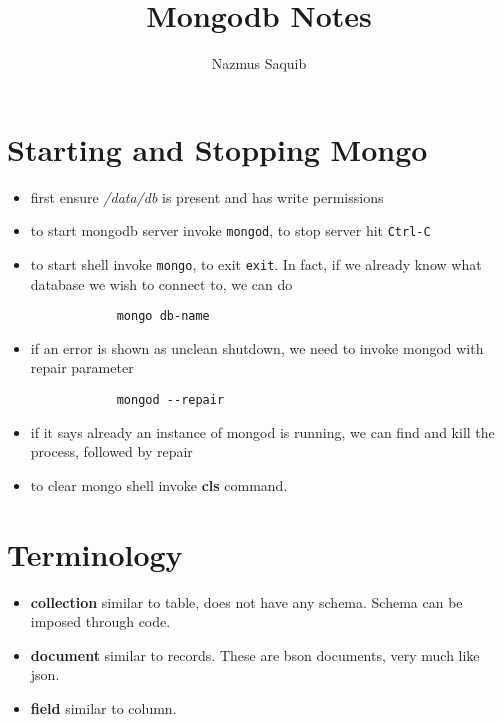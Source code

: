 \documentclass[a4paper, 12pt]{article}
\begin{document}
\title{Mongodb Notes}
\author{Nazmus Saquib}

\maketitle
\tableofcontents

\section{Starting and Stopping Mongo}
\begin{itemize}
    \item first ensure \emph{/data/db} is present and has write permissions
    \item to start mongodb server invoke \verb|mongod|, to stop server hit \verb|Ctrl-C|
    \item to start shell invoke \verb|mongo|, to exit \verb|exit|. In fact, if we already know what database we wish to connect to, we can do
		\begin{verbatim}
			mongo db-name
		\end{verbatim}
    \item if an error is shown as unclean shutdown, we need to invoke mongod with repair parameter
        \begin{verbatim}
            mongod --repair
        \end{verbatim}
    \item if it says already an instance of mongod is running, we can find and kill the process, followed by repair
	\item to clear mongo shell invoke \textbf{cls} command.
\end{itemize}

\section{Terminology}
\begin{itemize}
    \item \textbf{collection} similar to table, does not have any schema. Schema can be imposed through code.
    \item \textbf{document} similar to records. These are bson documents, very much like json.
    \item \textbf{field} similar to column.
\end{itemize}

\end{document}
